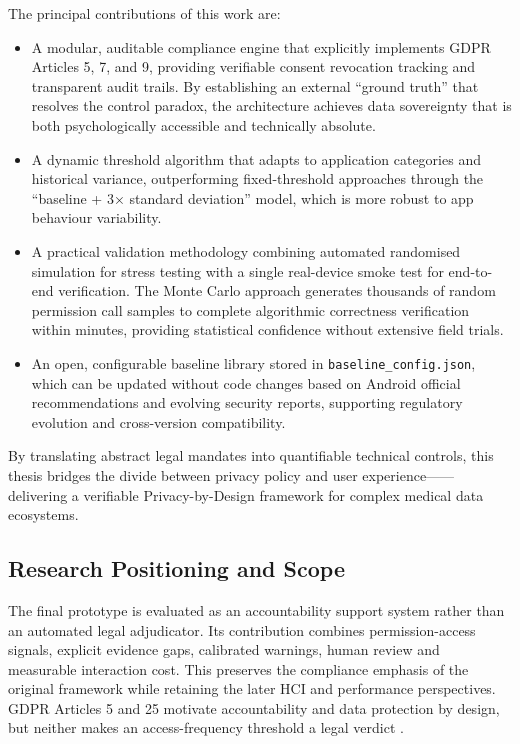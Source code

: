 The principal contributions of this work are:

\begin{itemize}
\item A modular, auditable compliance engine that explicitly implements GDPR Articles 5, 7, and 9, providing verifiable consent revocation tracking and transparent audit trails. By establishing an external ``ground truth'' that resolves the control paradox, the architecture achieves data sovereignty that is both psychologically accessible and technically absolute.
\item A dynamic threshold algorithm that adapts to application categories and historical variance, outperforming fixed-threshold approaches through the ``baseline + 3× standard deviation'' model, which is more robust to app behaviour variability.
\item A practical validation methodology combining automated randomised simulation for stress testing with a single real-device smoke test for end-to-end verification. The Monte Carlo approach generates thousands of random permission call samples to complete algorithmic correctness verification within minutes, providing statistical confidence without extensive field trials.
\item An open, configurable baseline library stored in \texttt{baseline\_config.json}, which can be updated without code changes based on Android official recommendations and evolving security reports, supporting regulatory evolution and cross-version compatibility.
\end{itemize}

By translating abstract legal mandates into quantifiable technical controls, this thesis bridges the divide between privacy policy and user experience——delivering a verifiable Privacy-by-Design framework for complex medical data ecosystems.

\subsection{Research Positioning and Scope}

The final prototype is evaluated as an accountability support system rather than an automated legal adjudicator. Its contribution combines permission-access signals, explicit evidence gaps, calibrated warnings, human review and measurable interaction cost. This preserves the compliance emphasis of the original framework while retaining the later HCI and performance perspectives. GDPR Articles 5 and 25 motivate accountability and data protection by design, but neither makes an access-frequency threshold a legal verdict \cite{eurlex2016,edpb2019}.


